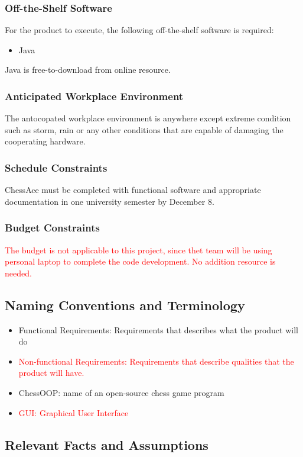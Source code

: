 \documentclass[12pt, titlepage]{article}
\begin{document}
\subsubsection{Off-the-Shelf Software}
For the product to execute, the following off-the-shelf software is required:
\begin{itemize}
\item Java
\end{itemize}
Java is free-to-download from online resource.
\subsubsection{Anticipated Workplace Environment}
The antocopated workplace environment is anywhere except extreme condition such as storm, rain or any other conditions that are capable of damaging the cooperating hardware.
\subsubsection{Schedule Constraints}
ChessAce must be completed with functional software and appropriate documentation in one university semester by December 8.
\subsubsection{Budget Constraints}
\textcolor{red}{The budget is not applicable to this project, since thet team will be using personal laptop to complete the code development. No addition resource is needed.}
\subsection{Naming Conventions and Terminology}
\begin{itemize}
\item Functional Requirements: Requirements that describes what the product will do
\item \textcolor{red}{Non-functional Requirements: Requirements that describe qualities that the product will have.}
\item ChessOOP: name of an open-source chess game program
\item \textcolor{red}{GUI: Graphical User Interface}

\end{itemize}

\subsection{Relevant Facts and Assumptions}
\end{document}
